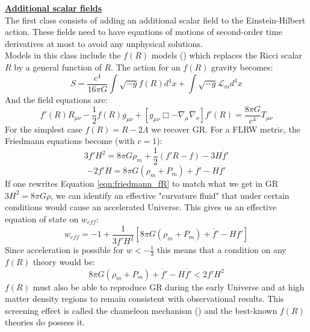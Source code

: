 \noindent \textbf{\underline{Additional scalar fields}} \\

The first class consists of adding an additional scalar field to the Einstein-Hilbert action. These fields need to have equations of motions of second-order time derivatives 
at most to avoid any unphysical solutions. \\

Models in this class include the $f(R)$ models (\cite{Sotiriou_2010}) which replaces the Ricci scalar $R$ by a general function of $R$. The action for an $f(R)$ gravity becomes:
\begin{equation}
    S = \frac{c^4}{16\pi G}\int \sqrt{-g} f(R) d^4x + \int \sqrt{-g} \mathcal{L}_m d^4x
\end{equation}
And the field equations are:
\begin{equation}
    f'(R)R_{\mu \nu} - \frac{1}{2}f(R)g_{\mu \nu} + [g_{\mu \nu}\Box -\nabla_{\mu}\nabla_{\nu}]f'(R) = \frac{8 \pi G}{c^4}T_{\mu \nu}
\end{equation}
For the simplest case $f(R)=R-2\Lambda$ we recover GR. For a FLRW metric, the Friedmann equations become (with $c=1$):
\begin{equation}
    3f'H^2 = 8\pi G \rho_m + \frac{1}{2}(f'R-f) - 3H \dot{f'}
\label{eqn:friedmann_fR}
\end{equation}
\begin{equation}
    -2f'\dot{H} = 8 \pi G (\rho_m + P_m) + \ddot{f'} - H \dot{f'}
\end{equation}
If one rewrites Equation \ref{eqn:friedmann_fR} to match what we get in GR $3H^2 = 8\pi G\rho$, we can identify an effective "curvature fluid" that under certain conditions 
would cause an accelerated Universe. This gives us an effective equation of state on $w_{eff}$:
\begin{equation}
    w_{eff} = -1 + \frac{1}{3f'H^2}\left[8\pi G(\rho_m + P_m) + \ddot{f'} - H \dot{f'} \right]
\end{equation}
Since acceleration is possible for $w<-\frac{1}{3}$ this means that a condition on any $f(R)$ theory would be:
\begin{equation}
    8\pi G(\rho_m + P_m) + \ddot{f'}-H\dot{f'}<2f'H^2
\end{equation}
$f(R)$ must also be able to reproduce GR during the early Universe and at high matter density regions to remain consistent with observational results. This screening effect is called 
the chameleon mechanism (\cite{Khoury_2004}) and the best-known $f(R)$ theories do possess it. \\

